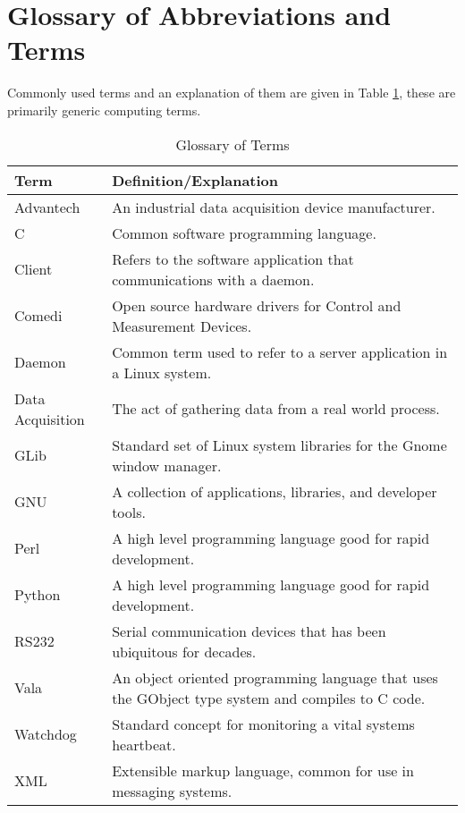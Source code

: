\documentclass[11pt]{article}
\begin{document}
  \newpage
  \printbibliography

  \newpage
  \addappheadtotoc
  \appendix
  \appendixpage

  \section{Glossary of Abbreviations and Terms}
    \label{app:glossary}

    Commonly used terms and an explanation of them are given in Table
    \ref{tab:glossary}, these are primarily generic computing terms.

    \begin{table}[H]
      \centering
      \begin{tabular}{l | p{10cm}}
        \hline
        Term & Definition/Explanation \\ [0.5ex]
        \hline\hline
        Advantech & An industrial data acquisition device manufacturer. \\
        C & Common software programming language. \\
        Client & Refers to the software application that communications with a daemon. \\
        Comedi & Open source hardware drivers for Control and Measurement Devices. \\
        Daemon & Common term used to refer to a server application in a Linux system. \\
        Data Acquisition & The act of gathering data from a real world process. \\
        GLib & Standard set of Linux system libraries for the Gnome window manager. \\
        GNU & A collection of applications, libraries, and developer tools. \\
        Perl & A high level programming language good for rapid development. \\
        Python & A high level programming language good for rapid development. \\
        RS232 & Serial communication devices that has been ubiquitous for decades. \\
        Vala & An object oriented programming language that uses the GObject type system and compiles to C code. \\
        Watchdog & Standard concept for monitoring a vital systems heartbeat. \\
        XML & Extensible markup language, common for use in messaging systems. \\
        \hline
      \end{tabular}
      \caption{Glossary of Terms}
      \label{tab:glossary}
    \end{table}
\end{document}
